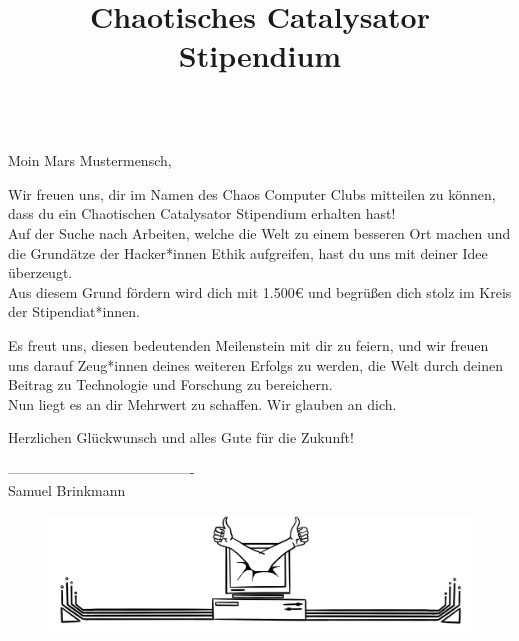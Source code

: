 \documentclass{article}
\title{Chaotisches Catalysator Stipendium}
\newcommand{\smallfont}[1]{{%
  \fontsize{13pt}{16pt}\normalfont #1%
}}
\newcommand{\normfont}[1]{{%
  \fontsize{20pt}{24pt}\normalfont #1%
}}
\newcommand{\bigfont}[1]{{%
  \fontsize{30pt}{36pt}\normalfont #1%
}}
\begin{document}

\vspace{0.9cm}

\begin{adjustwidth}{3cm}{3cm}
    \smallfont{\firasans \RaggedRight  \\ \smallskip
    Moin Mars Mustermensch, \bigskip
    
    Wir freuen uns, dir im Namen des Chaos Computer Clubs mitteilen zu können, dass du ein Chaotischen Catalysator Stipendium erhalten hast! \\ \bigskip
    Auf der Suche nach Arbeiten, welche die Welt zu einem besseren Ort machen und die Grundätze der Hacker*innen Ethik aufgreifen, hast du uns mit deiner Idee überzeugt. \\
    Aus diesem Grund fördern wird dich mit 1.500€ und begrüßen dich stolz im Kreis der Stipendiat*innen.\\ \bigskip

    Es freut uns, diesen bedeutenden Meilenstein mit dir zu feiern, und wir freuen uns darauf Zeug*innen deines weiteren Erfolgs zu werden, die Welt durch deinen  Beitrag zu Technologie und Forschung zu bereichern. \\ 
    Nun liegt es an dir Mehrwert zu schaffen. Wir glauben an dich. \\ \bigskip
    
    
    Herzlichen Glückwunsch und alles Gute für die Zukunft!\\[3\baselineskip]
    \par}
\end{adjustwidth}

\begin{adjustwidth}{3cm}{3cm}
    \RaggedLeft ---------------------------------------- \\
    \smallfont{\firasans Samuel Brinkmann}
\end{adjustwidth}

\begin{figure}[b]
	\begin{center}
		\includegraphics[width=0.9\paperwidth] {deco_bottom}
	\end{center}
\end{figure}
\end{document}
